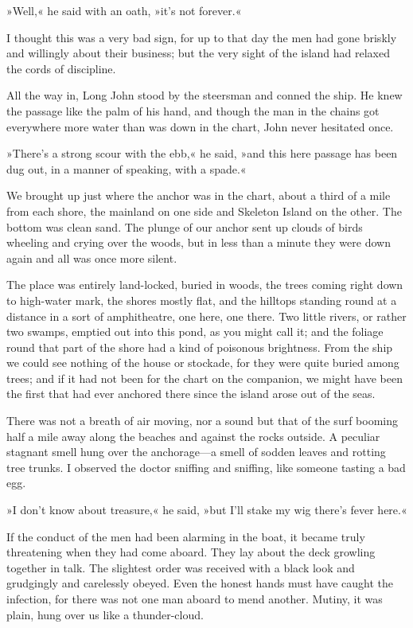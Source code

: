 »Well,« he said with an oath, »it's not forever.«

I thought this was a very bad sign, for up to that day the men had gone briskly and willingly about their business; but the very sight of the island had relaxed the cords of discipline.

All the way in, Long John stood by the steersman and conned the ship. He knew the passage like the palm of his hand, and though the man in the chains got everywhere more water than was down in the chart, John never hesitated once.

»There's a strong scour with the ebb,« he said, »and this here passage has been dug out, in a manner of speaking, with a spade.«

We brought up just where the anchor was in the chart, about a third of a mile from each shore, the mainland on one side and Skeleton Island on the other. The bottom was clean sand. The plunge of our anchor sent up clouds of birds wheeling and crying over the woods, but in less than a minute they were down again and all was once more silent.

The place was entirely land-locked, buried in woods, the trees coming right down to high-water mark, the shores mostly flat, and the hilltops standing round at a distance in a sort of amphitheatre, one here, one there. Two little rivers, or rather two swamps, emptied out into this pond, as you might call it; and the foliage round that part of the shore had a kind of poisonous brightness. From the ship we could see nothing of the house or stockade, for they were quite buried among trees; and if it had not been for the chart on the companion, we might have been the first that had ever anchored there since the island arose out of the seas.

There was not a breath of air moving, nor a sound but that of the surf booming half a mile away along the beaches and against the rocks outside. A peculiar stagnant smell hung over the an\-chor\-age—a smell of sodden leaves and rotting tree trunks. I observed the doctor sniffing and sniffing, like someone tasting a bad egg.

»I don't know about treasure,« he said, »but I'll stake my wig there's fever here.«

If the conduct of the men had been alarming in the boat, it became truly threatening when they had come aboard. They lay about the deck growling together in talk. The slightest order was received with a black look and grudgingly and carelessly obeyed. Even the honest hands must have caught the infection, for there was not one man aboard to mend another. Mutiny, it was plain, hung over us like a thunder-cloud.

